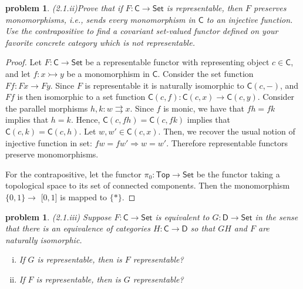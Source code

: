 \documentclass[10pt, oneside]{article}   	%
\newcommand{\cat}[1]{\mathsf{#1}}
\newcommand{\cc}{\cat{C}}
\newcommand{\dd}{\cat{D}}
\newcommand{\cset}{\cat{Set}}
\newcommand{\mono}{\rightarrowtail}
\newtheorem{problem}[theorem]{problem}
\begin{document}
\begin{problem}{(2.1.ii)}Prove that if $F : \cc \to \cset$ is representable, then $F$ preserves monomorphisms, i.e., sends every monomorphism in $\cc$ to an injective function. Use the contrapositive to find a covariant set-valued functor defined on your favorite concrete category which is not representable. 
\end{problem}

\begin{proof}
 
 Let $F : \cc \to \cset$ be a representable functor with representing object $c \in \cc$, and let $f : x \mono y$ be a monomorphism in $\cc$. Consider the set function $Ff : Fx \to Fy$. Since $F$ is representable it is naturally isomorphic to $\cc(c, -)$, and $Ff$ is then isomorphic to a set function $\cc(c,f) : \cc(c, x) \to \cc(c, y)$. Consider the parallel morphisms $h, k : w \rightrightarrows x$. Since $f$ is monic, we have that $fh = fk$ implies that $h = k$. Hence, $\cc(c, fh) = \cc(c, fk)$ implies that  $\cc(c, k) = \cc(c, h)$. Let $w, w'\in \cc(c, x)$. Then, we recover the usual notion of injective function in set: $f w = f w' \Rightarrow w = w'$. Therefore representable functors preserve monomorphisms.
 
 For the contrapositive, let the functor $\pi_0 : \cat{Top} \to \cset$ be the functor taking a topological space to its set of connected components. Then the monomorphism $\{0, 1\} \to $ [$0,1$] is mapped to $\{*\}$.
\end{proof}

\begin{problem} (2.1.iii) Suppose $F: \cc \to \cset$ is equivalent to $G: \dd \to \cset$ in the sense that there is an equivalence of categories $H: \cc \to \dd$ so that $GH$ and $F$ are naturally isomorphic. 

\begin{enumerate}[(i)]
	\item If $G$ is representable, then is $F$ representable?
	\item If $F$ is representable, then is $G$ representable?
\end{enumerate}
\end{problem}
\end{document}

